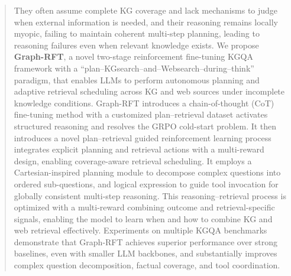 \documentclass[sigconf]{acmart}
\begin{document}
\begin{abstract}
They often assume complete KG coverage and lack mechanisms to judge when external information is needed, and their reasoning remains locally myopic, failing to maintain coherent multi-step planning, leading to reasoning failures even when relevant knowledge exists.
We propose \textbf{Graph-RFT}, a novel two-stage reinforcement fine-tuning KGQA framework with a “plan–KGsearch–and–Websearch–during–think” paradigm, that enables LLMs to perform autonomous planning and adaptive retrieval scheduling across KG and web sources under incomplete knowledge conditions. 
Graph-RFT introduces a chain-of-thought (CoT) fine-tuning method with a customized plan–retrieval dataset activates structured reasoning and resolves the GRPO cold-start problem.
It then introduces a novel plan–retrieval guided reinforcement learning process integrates explicit planning and retrieval actions with a multi-reward design, enabling coverage-aware retrieval scheduling.
It employs a Cartesian-inspired planning module to decompose complex questions into ordered sub-questions, and logical expression to guide tool invocation for globally consistent multi-step reasoning.
This reasoning–retrieval process is optimized with a multi-reward combining outcome and retrieval-specific signals, enabling the model to learn when and how to combine KG and web retrieval effectively.
Experiments on multiple KGQA benchmarks demonstrate that Graph-RFT achieves superior performance over strong baselines, even with smaller LLM backbones, and substantially improves complex question decomposition, factual coverage, and tool coordination. 


\end{abstract}
\end{document}
